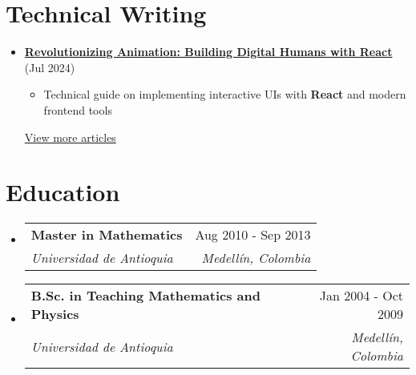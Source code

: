 \documentclass[letterpaper,11pt]{article}
\makeatletter
\newcommand{\resumeSubheading}[4]{
  \vspace{-2pt}
  \item[]
  \begin{tabular*}{\textwidth}{@{\extracolsep{\fill}}l r}
    \textbf{#1} & #2 \\
    \textit{#3} & \textit{#4} \\
  \end{tabular*}
  \vspace{-5pt}
}
\newcommand{\normalfaExternalLink}{{\mdseries\faExternalLink}}
\makeatother
\begin{document}
\section{Technical Writing}
\begin{itemize}[leftmargin=*]    
    \item \textbf{\href{https://www.asanchezyali.com/blog/ai-avatars/20240703DigitalHuman}{Revolutionizing Animation: Building Digital Humans with React}} (Jul 2024)
    \begin{itemize}
        \item Technical guide on implementing interactive UIs with \textbf{React} and modern frontend tools
    \end{itemize}
    
    \href{https://www.asanchezyali.com/}{View more articles \normalfaExternalLink}
\end{itemize}

\section{Education}
\begin{itemize}[leftmargin=0pt, itemindent=0pt, label={}]
\resumeSubheading
{Master in Mathematics}{Aug 2010 - Sep 2013}
{Universidad de Antioquia}{Medellín, Colombia}

\resumeSubheading
{B.Sc. in Teaching Mathematics and Physics}{Jan 2004 - Oct 2009}
{Universidad de Antioquia}{Medellín, Colombia}
\end{itemize}
\end{document}
